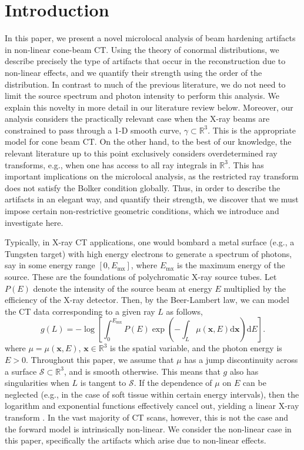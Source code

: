 \documentclass[11pt]{article}
\newcommand{\be}{\begin{equation}}
\newcommand{\ee}{\end{equation}}
\newcommand{\s}{\mathcal S}
\newcommand{\br}{\mathbb{R}}
\numberwithin{equation}{section}
\newcommand{\paren}[1]{\left(#1\right)}               %
\newcommand{\vx}{\mathbf{x}}
\theoremstyle{definition}
\begin{document}
\section{Introduction}
In this paper, we present a novel microlocal analysis of beam hardening artifacts in non-linear cone-beam CT. Using the theory of conormal distributions, we describe precisely the type of artifacts that occur in the reconstruction due to non-linear effects, and we quantify their strength using the order of the distribution. In contrast to much of the previous literature, we do not need to limit the source spectrum and photon intensity to perform this analysis. We explain this novelty in more detail in our literature review below.
Moreover, our analysis considers the practically relevant case when the X-ray beams are constrained to pass through a 1-D smooth curve, $\gamma \subset \mathbb{R}^3$. This is the appropriate model for cone beam CT.  On the other hand, to the best of our knowledge, the relevant literature up to this point exclusively considers overdetermined ray transforms, e.g., when one has access to all ray integrals in $\br^3$. This has important implications on the microlocal analysis, as the restricted ray transform does not satisfy the Bolker condition globally. Thus, in order to describe the artifacts in an elegant way, and quantify their strength, we discover that we must impose certain non-restrictive geometric conditions, which we introduce and investigate here.

Typically, in X-ray CT applications, one would bombard a metal surface (e.g., a Tungsten target) with high energy electrons to generate a spectrum of photons, say in some energy range $[0,E_{\text{mx}}]$, where $E_{\text{mx}}$ is the maximum energy of the source. These are the foundations of polychromatic X-ray source tubes. Let $P(E)$ denote the intensity of the source beam at energy $E$ multiplied by the efficiency of the X-ray detector. Then, by the Beer-Lambert law, we can model the CT data corresponding to a given ray $L$ as follows,
\be\label{mod_intro}
g(L) =-\log\left[ \int_0^{E_{\mathrm{mx}}}P(E)\exp\paren{ -\int_L \mu(\vx,E) \mathrm{d}\vx } \mathrm{d}E\right].
\ee
where $\mu = \mu(\vx,E)$, $\vx \in \mathbb{R}^3$ is the spatial variable, and the photon energy is $E > 0$. Throughout this paper, we assume that $\mu$ has a jump discontinuity across a surface $\s\subset\br^3$, and is smooth otherwise. This means that $g$ also has singularities when $L$ is tangent to $\s$. If the dependence of $\mu$ on $E$ can be neglected (e.g., in the case of soft tissue within certain energy intervals), then the logarithm and exponential functions effectively cancel out, yielding a linear X-ray transform \cite{katsevich2026}. In the vast majority of CT scans, however, this is not the case and the forward model is intrinsically non-linear. We consider the non-linear case in this paper, specifically the artifacts which arise due to non-linear effects.
\end{document}
